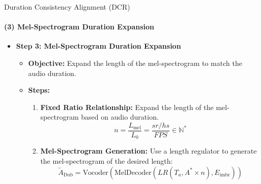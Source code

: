 \begin{frame}{Duration Consistency Alignment (DCR)}
\framesubtitle{(3) Mel-Spectrogram Duration Expansion}
\begin{itemize}
    \item \textbf{Step 3: Mel-Spectrogram Duration Expansion}
    \begin{itemize}
    \item \textbf{Objective:} Expand the length of the mel-spectrogram to match the audio duration.
    \item \textbf{Steps:}
    \begin{enumerate}
        \item \textbf{Fixed Ratio Relationship:} Expand the length of the mel-spectrogram based on audio duration.
        \begin{equation}
            n = \frac{L_{\text{mel}}}{L_0} = \frac{sr/hs}{FPS} \in \mathbb{N}^*
        \end{equation}
        \item \textbf{Mel-Spectrogram Generation:} Use a length regulator to generate the mel-spectrogram of the desired length:
        \begin{equation}
            \tilde{A}_{\text{Dub}} = \text{Vocoder}(\text{MelDecoder}(LR(T_a, A^* \times n), E_{\text{imbr}}))
        \end{equation}
    \end{enumerate}
\end{itemize}
\end{itemize}
\end{frame}